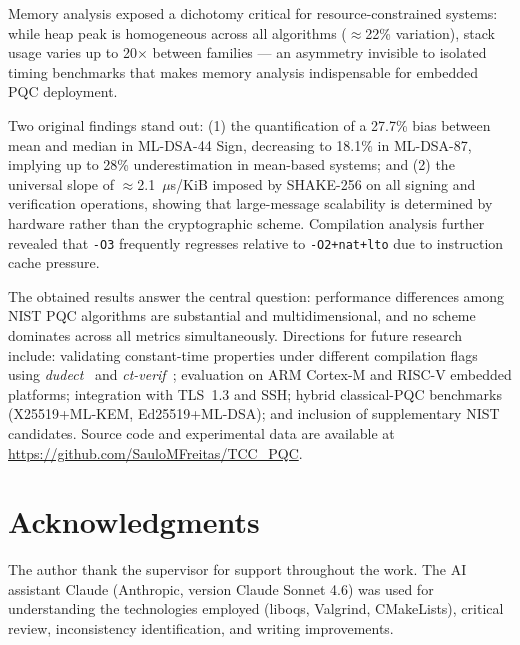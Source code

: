 \documentclass[12pt]{article}
\begin{document}
Memory analysis exposed a dichotomy critical for resource-constrained
systems: while heap peak is homogeneous across all algorithms ($\approx$22\%
variation), stack usage varies up to 20$\times$ between families --- an
asymmetry invisible to isolated timing benchmarks that makes memory analysis
indispensable for embedded PQC deployment.

Two original findings stand out: (1) the quantification of a 27.7\% bias
between mean and median in ML-DSA-44 Sign, decreasing to 18.1\% in
ML-DSA-87, implying up to 28\% underestimation in mean-based systems; and
(2) the universal slope of $\approx$2.1~$\mu$s/KiB imposed by SHAKE-256 on
all signing and verification operations, showing that large-message
scalability is determined by hardware rather than the cryptographic scheme.
Compilation analysis further revealed that \texttt{-O3} frequently regresses
relative to \texttt{-O2+nat+lto} due to instruction cache pressure.

The obtained results answer the central question: performance differences
among NIST PQC algorithms are substantial and multidimensional, and no
scheme dominates across all metrics simultaneously. Directions for future
research include: validating constant-time properties under different
compilation flags using \textit{dudect}~\cite{Reparaz:2017} and
\textit{ct-verif}~\cite{Almeida:2016}; evaluation on ARM Cortex-M and
RISC-V embedded platforms; integration with TLS~1.3 and SSH; hybrid
classical-PQC benchmarks (X25519+ML-KEM, Ed25519+ML-DSA); and inclusion
of supplementary NIST candidates. Source code and experimental data are
available at \url{https://github.com/SauloMFreitas/TCC_PQC}.

\section*{Acknowledgments}
The author thank the supervisor for support throughout the work. The AI
assistant Claude (Anthropic, version Claude Sonnet 4.6) was used for
understanding the technologies employed (liboqs, Valgrind, CMakeLists),
critical review, inconsistency identification, and writing improvements.



\end{document}
